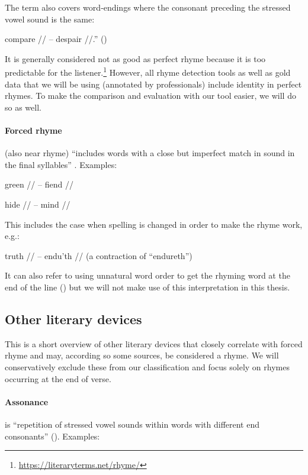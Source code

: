  The term also covers word‐endings where the consonant preceding the stressed vowel sound is the same: 
 
 compare // -- despair //.'' (\cite{oxforddict2008literary})
 
 It is generally considered not as good as perfect rhyme because it is too predictable for the listener.\footnote{\url{https://literaryterms.net/rhyme/}}
 However, all rhyme detection tools as well as gold data that we will be using (annotated by professionals) include identity in perfect rhymes. To make the comparison and evaluation with our tool easier, we will do so as well.

\paragraph{Forced rhyme} (also near rhyme) ``includes words with a close but imperfect match in sound in the final syllables'' \cite{bergman2017litcharts}. Examples: 

green // -- fiend //

hide // -- mind //

\noindent This includes the case when spelling is changed in order to make the rhyme work, e.g.:

 truth // -- endu'th // (a contraction of ``endureth'')
 
 It can also refer to using unnatural word order to get the rhyming word at the end of the line (\cite{bergman2017litcharts}) but we will not make use of this interpretation in this thesis.

\subsection{Other literary devices}
This is a short overview of other literary devices that closely correlate with forced rhyme and may, according so some sources, be considered a rhyme. We will conservatively exclude these from our classification and focus solely on rhymes occurring at the end of verse.

\paragraph{Assonance} is ``repetition of stressed vowel sounds within words with different end consonants'' (\cite{britannica}). Examples:	

